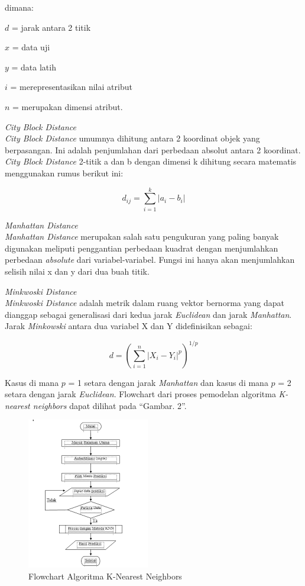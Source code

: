 \documentclass[conference]{IEEEtran}
\begin{document}
dimana:

$d$ = jarak antara 2 titik

$x$ = data uji

$y$ = data latih

$i$ = merepresentasikan nilai atribut

$n$ = merupakan dimensi atribut.\vspace{10pt}

\noindent\emph{City Block Distance}\\
\emph{City Block Distance} umumnya dihitung antara 2 koordinat objek yang berpasangan. Ini adalah penjumlahan dari perbedaan absolut antara 2 koordinat. \emph{City Block Distance} 2-titik a dan b dengan dimensi k dihitung secara matematis menggunakan rumus berikut ini:

\begin{equation*}
d_{ij}=\sum^{k}_{i=1} | a_i-b_i |
\label{eq2}
\end{equation*}

\noindent\emph{Manhattan Distance}\\
\emph{Manhattan Distance} merupakan salah satu pengukuran yang paling banyak digunakan meliputi penggantian perbedaan kuadrat dengan menjumlahkan perbedaan \emph{absolute} dari variabel-variabel. Fungsi ini hanya akan menjumlahkan selisih nilai x dan y dari dua buah titik.
\vspace{10pt}

\noindent\emph{Minkwoski Distance}\\
\emph{Minkwoski Distance} adalah metrik dalam ruang vektor bernorma yang dapat dianggap sebagai generalisasi dari kedua jarak \emph{Euclidean} dan jarak \emph{Manhattan}. Jarak \emph{Minkowski} antara dua variabel X dan Y didefinisikan sebagai:

\begin{equation*}
d = (\sum^{n}_{i=1} | X_i-Y_i |^p)^{1/p}
\label{eq3}
\end{equation*}

Kasus di mana $p$ = 1 setara dengan jarak \emph{Manhattan} dan kasus di mana $p$ = 2 setara dengan jarak \emph{Euclidean}.
Flowchart dari proses pemodelan algoritma \emph{K-nearest neighbors} dapat dilihat pada ``Gambar. 2''\cite{lubis2020optimization}.\vspace{6pt}
\begin{figure}
\centering
\includegraphics[width=.4\textwidth]{Gambar/gambar3.png}
\caption{Flowchart Algoritma K-Nearest Neighbors}
\end{figure}
\end{document}
